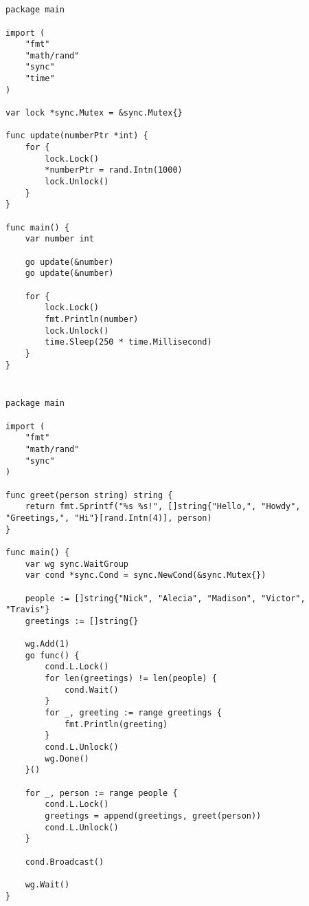 \newpage
\section{}
\begin{lstlisting}[style=goRaw,caption={\centering Ausführlicher Programmcode zu Listing \ref{lst:go:sync:concurrency:ex4} (\nameref{lst:go:sync:concurrency:ex4})}]
package main

import (
    "fmt"
    "math/rand"
    "sync"
    "time"
)

var lock *sync.Mutex = &sync.Mutex{}

func update(numberPtr *int) {
    for {
        lock.Lock()
        *numberPtr = rand.Intn(1000)
        lock.Unlock()
    }
}

func main() {
    var number int
    
    go update(&number)
    go update(&number)
    
    for {
        lock.Lock()
        fmt.Println(number)
        lock.Unlock()
        time.Sleep(250 * time.Millisecond)
    }
}
\end{lstlisting}

\newpage
\section{}
\begin{lstlisting}[style=goRaw,caption={\centering Ausführlicher Programmcode zu Listing \ref{lst:go:sync:concurrency:ex5} (\nameref{lst:go:sync:concurrency:ex5})}]
package main

import (
    "fmt"
    "math/rand"
    "sync"
)

func greet(person string) string {
    return fmt.Sprintf("%s %s!", []string{"Hello,", "Howdy", "Greetings,", "Hi"}[rand.Intn(4)], person)
}

func main() {
    var wg sync.WaitGroup
    var cond *sync.Cond = sync.NewCond(&sync.Mutex{})
    
    people := []string{"Nick", "Alecia", "Madison", "Victor", "Travis"}
    greetings := []string{}
    
    wg.Add(1)
    go func() {
        cond.L.Lock()
        for len(greetings) != len(people) {
            cond.Wait()
        }
        for _, greeting := range greetings {
            fmt.Println(greeting)
        }
        cond.L.Unlock()
        wg.Done()
    }()
    
    for _, person := range people {
        cond.L.Lock()
        greetings = append(greetings, greet(person))
        cond.L.Unlock()
    }
    
    cond.Broadcast()
    
    wg.Wait()
}
\end{lstlisting}